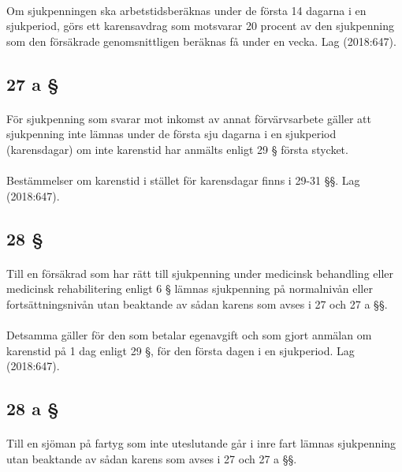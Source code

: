 \documentclass[a4paper,notitlepage,openany,10pt]{book}
\begin{document}
\paragraph*{}
Om sjukpenningen ska arbetstidsberäknas under de första 14 dagarna i en sjukperiod, görs ett karensavdrag som motsvarar 20 procent av den sjukpenning som den försäkrade genomsnittligen beräknas få under en vecka.
Lag (2018:647).
\subsection*{27 a §}
\paragraph*{}
För sjukpenning som svarar mot inkomst av annat förvärvsarbete gäller att sjukpenning inte lämnas under de första sju dagarna i en sjukperiod (karensdagar) om inte karenstid har anmälts enligt 29 § första stycket.
\paragraph*{}
Bestämmelser om karenstid i stället för karensdagar finns i 29-31 §§.
Lag (2018:647).
\subsection*{28 §}
\paragraph*{}
Till en försäkrad som har rätt till sjukpenning under medicinsk behandling eller medicinsk rehabilitering enligt 6 § lämnas sjukpenning på normalnivån eller fortsättningsnivån utan beaktande av sådan karens som avses i 27 och 27 a §§.
\paragraph*{}
Detsamma gäller för den som betalar egenavgift och som gjort anmälan om karenstid på 1 dag enligt 29 §, för den första dagen i en sjukperiod.
Lag (2018:647).
\subsection*{28 a §}
\paragraph*{}
Till en sjöman på fartyg som inte uteslutande går i inre fart lämnas sjukpenning utan beaktande av sådan karens som avses i 27 och 27 a §§.
\end{document}
